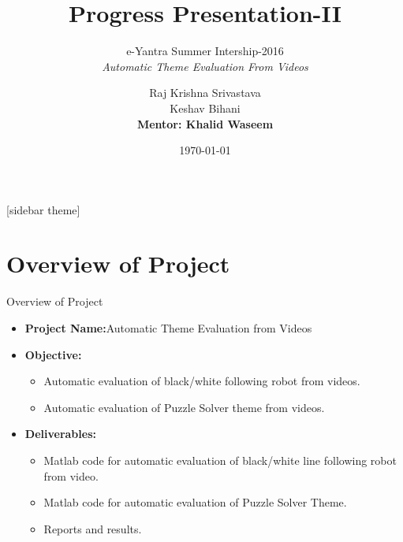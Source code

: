 \documentclass[10pt, a4paper]{beamer}
\begin{document}
	\title{Progress Presentation-II}
	\subtitle{e-Yantra Summer Intership-2016 \\ \textit{Automatic Theme Evaluation From Videos}}
	\author{Raj Krishna Srivastava\\Keshav Bihani\\ {    \textbf{Mentor: Khalid Waseem}}}
	\date{\today}
	\frame{\titlepage}

[sidebar theme]
\section{Overview of Project}
\begin{frame}{\begin{center}
			Overview of Project
		\end{center}}\vspace{-2cm}
	\begin{itemize}
		\item \textbf{Project Name:}Automatic Theme Evaluation from Videos
		\item \textbf{Objective:}
		\begin{itemize}
			\item Automatic evaluation of black/white following robot from videos.
			\item Automatic evaluation of Puzzle Solver theme from videos.
		\end{itemize}
		\item \textbf{Deliverables:}
				\begin{itemize}
					\item Matlab code for automatic evaluation of black/white line following robot from video.
					\item Matlab code for automatic evaluation of Puzzle Solver Theme.
					\item Reports and results.
				\end{itemize}
	\end{itemize}
\end{frame}
\end{document}
